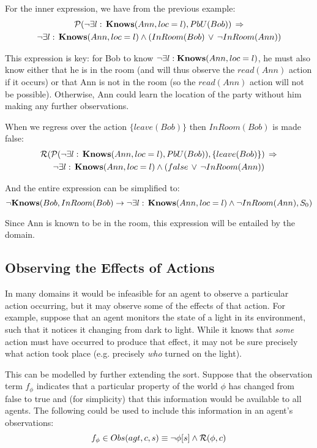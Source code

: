 For the inner expression, we have from the previous example:\begin{multline*}
\mathcal{P}(\neg\exists l:\,\mathbf{Knows}(Ann,loc=l),PbU(Bob))\,\Rightarrow\\
\neg\exists l:\,\mathbf{Knows}(Ann,loc=l)\wedge\left(InRoom(Bob)\,\vee\,\neg InRoom(Ann)\right)\end{multline*}


This expression is key: for Bob to know $\neg\exists l:\mathbf{Knows}(Ann,loc=l)$,
he must also know either that he is in the room (and will thus observe
the $read(Ann)$ action if it occurs) or that Ann is not in the room
(so the $read(Ann)$ action will not be possible). Otherwise, Ann
could learn the location of the party without him making any further
observations.

When we regress over the action $\{leave(Bob)\}$ then $InRoom(Bob)$
is made false:\begin{multline*}
\mathcal{R}(\mathcal{P}(\neg\exists l:\,\mathbf{Knows}(Ann,loc=l),PbU(Bob)),\{leave(Bob)\})\,\Rightarrow\\
\neg\exists l:\,\mathbf{Knows}(Ann,loc=l)\wedge\left(false\,\vee\,\neg InRoom(Ann)\right)\end{multline*}


And the entire expression can be simplified to:\[
\neg\mathbf{Knows}(Bob,InRoom(Bob)\rightarrow\neg\exists l:\,\mathbf{Knows}(Ann,loc=l)\wedge\neg InRoom(Ann),S_{0})\]


Since Ann is known to be in the room, this expression will be entailed
by the domain.


\subsection{Observing the Effects of Actions\label{sub:Observing-Effects}}

In many domains it would be infeasible for an agent to observe a particular
action occurring, but it may observe some of the effects of that action.
For example, suppose that an agent monitors the state of a light in
its environment, such that it notices it changing from dark to light.
While it knows that \emph{some} action must have occurred to produce
that effect, it may not be sure precisely what action took place (e.g.
precisely \emph{who} turned on the light).

This can be modelled by further extending the 
sort. Suppose that the observation term $f_{\phi}$ indicates that
a particular property of the world $\phi$ has changed from false
to true and (for simplicity) that this information would be available
to all agents. The following could be used to include this information
in an agent's observations:\[
f_{\phi}\in Obs(agt,c,s)\equiv\neg\phi[s]\wedge\mathcal{R}(\phi,c)\]
 

